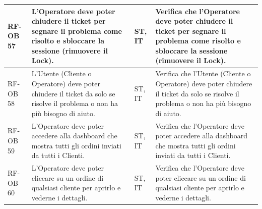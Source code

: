 \documentclass[a4paper,11pt,oneside]{scrartcl}
\begin{document}
\begin{longtable}{|p{1.5cm}|p{4.5cm}|p{1.8cm}|p{6cm}|}
    RF-OB 57         & L'Operatore deve poter chiudere il ticket per segnare il problema come risolto e sbloccare la sessione (rimuovere il Lock).                                                                                                                                                                           & ST, IT             & Verifica che l'Operatore deve poter chiudere il ticket per segnare il problema come risolto e sbloccare la sessione (rimuovere il Lock).                                                                                                                                                                           \\ \hline
    RF-OB 58         & L'Utente (Cliente o Operatore) deve poter chiudere il ticket da solo se risolve il problema o non ha più bisogno di aiuto.                                                                                                                                                                            & ST, IT             & Verifica che l'Utente (Cliente o Operatore) deve poter chiudere il ticket da solo se risolve il problema o non ha più bisogno di aiuto.                                                                                                                                                                            \\ \hline
    RF-OB 59         & L'Operatore deve poter accedere alla dashboard che mostra tutti gli ordini inviati da tutti i Clienti.                                                                                                                                                                                                & ST, IT             & Verifica che l'Operatore deve poter accedere alla dashboard che mostra tutti gli ordini inviati da tutti i Clienti.                                                                                                                                                                                                \\ \hline
    RF-OB 60         & L'Operatore deve poter cliccare su un ordine di qualsiasi cliente per aprirlo e vederne i dettagli.                                                                                                                                                                                                   & ST, IT             & Verifica che l'Operatore deve poter cliccare su un ordine di qualsiasi cliente per aprirlo e vederne i dettagli.                                                                                                                                                                                                   \\ \hline

\end{longtable}
\end{document}
